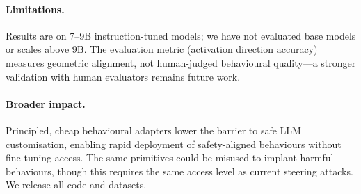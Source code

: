 \documentclass{article}
\begin{document}
\paragraph{Limitations.}
Results are on 7--9B instruction-tuned models; we have not evaluated base models or
scales above 9B.
The evaluation metric (activation direction accuracy) measures geometric alignment, not
human-judged behavioural quality—a stronger validation with human evaluators remains
future work.

\paragraph{Broader impact.}
Principled, cheap behavioural adapters lower the barrier to safe LLM customisation,
enabling rapid deployment of safety-aligned behaviours without fine-tuning access.
The same primitives could be misused to implant harmful behaviours, though this requires
the same access level as current steering attacks.
We release all code and datasets.



\end{document}
